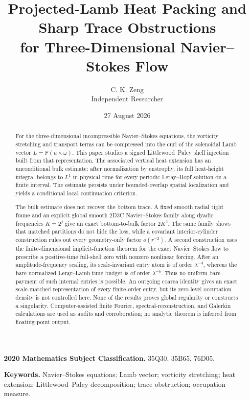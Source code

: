 \documentclass[11pt]{article}
\title{Projected-Lamb Heat Packing and Sharp Trace Obstructions\\
for Three-Dimensional Navier--Stokes Flow}
\author{C. K. Zeng\\[-1mm]\small Independent Researcher}
\date{27 August 2026}
\theoremstyle{definition}
\newcommand{\Pp}{\mathbb P}
\begin{document}
\maketitle

\begin{abstract}
For the three-dimensional incompressible Navier--Stokes equations, the
vorticity stretching and transport terms can be compressed into the curl of
the solenoidal Lamb vector
\(L=\Pp(u\times\omega)\).  This paper studies a signed Littlewood--Paley
shell injection built from that representation.  The associated vertical
heat extension has an unconditional bulk estimate: after normalization by
enstrophy, its full heat-height integral belongs to \(L^1\) in physical time
for every periodic Leray--Hopf solution on a finite interval.  The estimate
persists under bounded-overlap spatial localization and yields a conditional
local continuation criterion.

The bulk estimate does not recover the bottom trace.  A fixed smooth radial
tight frame and an explicit global smooth 2D3C Navier--Stokes family along
dyadic frequencies \(K=2^j\) give an exact bottom-to-bulk factor \(2K^2\).
The same family shows that matched
partitions do not hide the loss, while a covariant interior-cylinder
construction rules out every geometry-only factor \(o(r^{-2})\).  A second
construction uses the finite-dimensional implicit-function theorem for the
exact Navier--Stokes flow to prescribe a positive-time full-shell zero with
nonzero nonlinear forcing.  After an amplitude-frequency scaling, its
scale-invariant entry atom is of order \(\lambda^{-4}\), whereas the bare
normalized Leray--Lamb time budget is of order \(\lambda^{-6}\).  Thus no
uniform bare payment of such internal entries is possible.  An outgoing
coarea identity gives an exact scale-matched representation of every
finite-order entry, but its zero-level occupation density is not controlled
here.  None of the results proves global regularity or constructs a
singularity.  Computer-assisted finite Fourier, spectral-reconstruction, and
Galerkin calculations are used as audits and corroboration; no analytic
theorem is inferred from floating-point output.
\end{abstract}

\medskip
\noindent\textbf{2020 Mathematics Subject Classification.}
35Q30, 35B65, 76D05.

\noindent\textbf{Keywords.}
Navier--Stokes equations; Lamb vector; vorticity stretching; heat extension;
Littlewood--Paley decomposition; trace obstruction; occupation measure.
\end{document}
